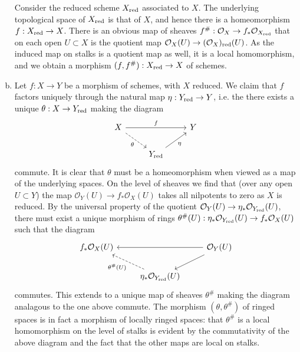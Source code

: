 \documentclass{mathnotes}
\begin{document}
\begin{enumerate}[(a)]
        Consider the reduced scheme $X_{\rm red}$ associated to $X$. The underlying topological space of $X_{\rm red}$
        is that of $X$, and hence there is a homeomorphism $f:X_{\rm red}\to X$. There is an obvious map of sheaves
        $f^\#:\mathcal{O}_X\to f_*\mathcal{O}_{X_{\rm red}}$ that on each open $U\subset X$ is the quotient map
        $\mathcal{O}_X(U)\to (\mathcal{O}_X)_{\rm red}(U)$. As the induced map on stalks is a quotient map as well,
        it is a local homomorphism, and we obtain a morphism $(f,f^\#):X_{\rm red}\to X$ of schemes.
    \item Let $f:X\to Y$ be a morphism of schemes, with $X$ reduced. We claim that $f$ factors uniquely
        through the natural map $\eta:Y_{\rm red}\to Y$, i.e. the there exists a unique $\theta:X\to Y_{\rm red}$
        making the diagram
        \begin{equation*}
            \begin{tikzcd}
                X\ar{rr}{f}\ar[dashed, swap]{rd}{\theta} & & Y\\
                & Y_{\rm red}\ar[swap]{ur}{\eta} &
            \end{tikzcd}
        \end{equation*}
        commute. It is clear that $\theta$ must be a homeomorphism when viewed as a map of the underlying spaces.
        On the level of sheaves we find that (over any open $U\subset Y$) the map $\mathcal{O}_Y(U)\to f_*\mathcal{O}_X(U)$
        takes all nilpotents to zero as $X$ is reduced. By the universal property of the quotient $\mathcal{O}_Y(U)\to \eta_*\mathcal{O}_{Y_{\rm red}}(U)$,
        there must exist a unique morphism of rings $\theta^\#(U):\eta_*\mathcal{O}_{Y_{\rm red}}(U)\to f_*\mathcal{O}_X(U)$ such that the diagram
        \begin{equation*}
            \begin{tikzcd}
                f_*\mathcal{O}_X(U) & & \mathcal{O}_Y(U)\ar{ll}\ar{ld}\\
                & \eta_*\mathcal{O}_{Y_{\rm red}}(U)\ar[dashed]{lu}{\theta^\#(U)} &
            \end{tikzcd}
        \end{equation*}
        commutes. This extends to a unique map of sheaves $\theta^\#$ making the diagram analagous to the one above commute. 
        The morphism $(\theta,\theta^\#)$ of ringed spaces is in fact a morphism of locally ringed spaces: that $\theta^\#$
        is a local homomorphism on the level of stalks is evident by the commutativity of the above diagram and the fact
        that the other maps are local on stalks.
\end{enumerate}
\end{document}
